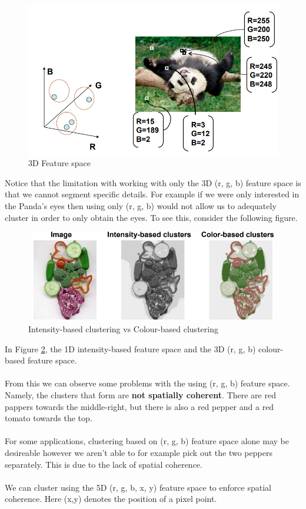 \documentclass{article}
\begin{document}
\newpage

\begin{figure}[htp]
    \centering
    \includegraphics[width=13cm]{slide_22_1}
    \caption{3D Feature space}
    \label{fig:Slide22_1}
\end{figure}

Notice that the limitation with working with only the 3D (r, g, b) feature space is that we cannot segment specific details. For example if we were only interested in the Panda's eyes then using only (r, g, b) would not allow us to adequately cluster in order to only obtain the eyes. To see this, consider the following figure.

\begin{figure}[htp]
    \centering
    \includegraphics[width=13cm,height=4cm]{slide_23_1}
    \caption{Intensity-based clustering vs Colour-based clustering}
    \label{fig:Slide23_1}
\end{figure}

In Figure \ref{fig:Slide23_1}, the 1D intensity-based feature space and the 3D (r, g, b) colour-based feature space.
\\\\
From this we can observe some problems with the using (r, g, b) feature space. Namely, the clusters that form are \textbf{not spatially coherent}. There are red pappers towards the middle-right, but there is also a red pepper and a red tomato towards the top.
\\\\
For some applications, clustering based on (r, g, b) feature space alone may be desireable however we aren't able to for example pick out the two peppers separately. This is due to the lack of spatial coherence.
\\\\
We can cluster using the 5D (r, g, b, x, y) feature space to enforce spatial coherence. Here (x,y) denotes the position of a pixel point.
\end{document}
